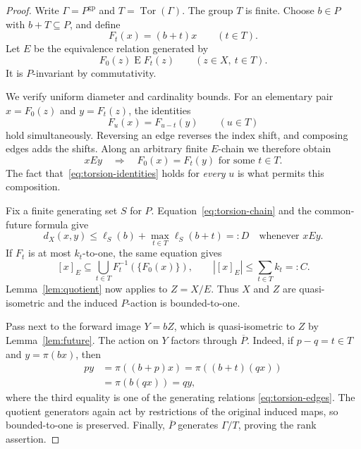\documentclass[11pt,letterpaper]{article}
\theoremstyle{definition}
\DeclareMathOperator{\Tor}{Tor}
\newcommand{\gp}{\mathrm{gp}}
\begin{document}
\begin{proof}
Write $\Gamma=P^{\gp}$ and $T=\Tor(\Gamma)$. The group $T$ is finite.
Choose $b\in P$ with $b+T\subseteq P$, and define
\[
 F_t(x)=(b+t)x\qquad(t\in T).
\]
Let $E$ be the equivalence relation generated by
\begin{equation}\label{eq:torsion-edges}
 F_0(z)\mathrel E F_t(z)\qquad(z\in X,\ t\in T).
\end{equation}
It is $P$-invariant by commutativity.

We verify uniform diameter and cardinality bounds. For an elementary pair
$x=F_0(z)$ and $y=F_t(z)$, the identities
\begin{equation}\label{eq:torsion-identities}
 F_u(x)=F_{u-t}(y)\qquad(u\in T)
\end{equation}
hold simultaneously. Reversing an edge reverses the index shift, and
composing edges adds the shifts. Along an arbitrary finite $E$-chain we
therefore obtain
\begin{equation}\label{eq:torsion-chain}
 xEy\quad\Longrightarrow\quad F_0(x)=F_t(y)
 \text{ for some }t\in T.
\end{equation}
The fact that~\eqref{eq:torsion-identities} holds for \emph{every} $u$ is
what permits this composition.

Fix a finite generating set $S$ for $P$. Equation~\eqref{eq:torsion-chain}
and the common-future formula give
\[
 d_X(x,y)\le \ell_S(b)+\max_{t\in T}\ell_S(b+t)=:D
 \quad\text{whenever }xEy.
\]
If $F_t$ is at most $k_t$-to-one, the same equation gives
\[
 [x]_E\subseteq\bigcup_{t\in T}F_t^{-1}(\{F_0(x)\}),
 \qquad |[x]_E|\le\sum_{t\in T}k_t=:C.
\]
Lemma~\ref{lem:quotient} now applies to $Z=X/E$. Thus $X$ and $Z$ are
quasi-isometric and the induced $P$-action is bounded-to-one.

Pass next to the forward image $Y=bZ$, which is quasi-isometric to $Z$ by
Lemma~\ref{lem:future}. The action on $Y$ factors through $\overline P$.
Indeed, if $p-q=t\in T$ and $y=\pi(bx)$, then
\[
 \begin{aligned}
 py&=\pi((b+p)x)
     =\pi((b+t)(qx))\\
   &=\pi(b(qx))=qy,
 \end{aligned}
\]
where the third equality is one of the generating relations
\eqref{eq:torsion-edges}. The quotient generators again act by restrictions
of the original induced maps, so bounded-to-one is preserved. Finally,
$\overline P$ generates $\Gamma/T$, proving the rank assertion.
\end{proof}
\end{document}
